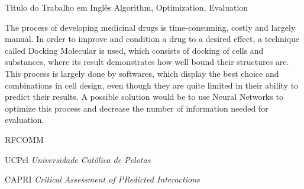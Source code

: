\documentclass[tcc, capa]{texucpel}
\begin{document}
\begin{englishabstract}
  {Titulo do Trabalho em Inglês}
  {Algorithm, Optimization, Evaluation}  
  

The process of developing medicinal drugs is time-consuming, costly and largely manual.
In order to improve and condition a drug to a desired effect, a technique called Docking Molecular is used, which consists of docking of cells and substances, where its result demonstrates how well bound their structures are. \\
This process is largely done by softwares, which display the best choice and combinations in cell design, even though they are quite limited in their ability to predict their results.
A possible solution would be to use Neural Networks to optimize this process and decrease the number of information needed for evaluation.

\end{englishabstract}

\listoffigures

\listoftables

\begin{listofabbrv}{RFCOMM}
		\item[UCPel] \textit{Universidade Cat\'olica de Pelotas}
        \item[CAPRI] \textit{Critical Assessment of PRedicted Interactions}

        
        
\end{listofabbrv}

\tableofcontents
\end{document}
